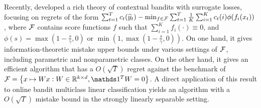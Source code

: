
Recently, \citet{Foster-Krishnamurthy-2018} developed a rich theory of
contextual bandits with surrogate losses, focusing on regrets of the form
$\sum_{t=1}^T c_t(\widehat{y}_t) - \min_{f \in \mathcal{F}} \sum_{t=1}^T \frac{1}{K} \sum_{i=1}^K c_t(i) \phi( f_i(x_t)
)$, where $\mathcal{F}$ contains score functions $f$ such that $\sum_{i=1}^K
f_i(\cdot) \equiv 0$, and $\phi(s) = \max(1 - \frac s \gamma, 0)$ or $\min(1,
\max(1 - \frac s \gamma, 0))$. On one hand, it gives information-theoretic
mistake upper bounds under various settings of $\mathcal{F}$, including parametric and
nonparametric classes. On the other hand, it gives an efficient algorithm that
has a $O(\sqrt{T})$ regret against the benchmark of $\calF = \cbr{x \mapsto W x:
W \in \R^{k \times d}, \one^T W = 0}$. A direct application of this result to
online bandit multiclass linear classification yields an algorithm with a
$O(\sqrt{T})$ mistake bound in the strongly linearly separable setting.


